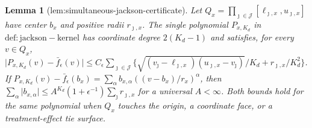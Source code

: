 \documentclass{article}
\newtheorem{lemma}{Lemma}
\begin{document}
\begin{lemma}[lem:simultaneous-jackson-certificate]\label{lem:simultaneous-jackson-certificate}
Let \(Q_x=\prod_{\jmath\in\mathcal J}[\ell_{\jmath,x},u_{\jmath,x}]\) have center \(b_x\) and positive radii \(r_{\jmath,x}\). The single polynomial \(P_{x,K_d}\) in \(\mathrm{def:jackson-kernel}\) has coordinate degree \(2(K_d-1)\) and satisfies, for every \(v\in Q_x\), \(\lvert P_{x,K_d}(v)-\bar f_\epsilon(v)\rvert\leq C_\epsilon\sum_{\jmath\in\mathcal J}\{\sqrt{(v_{\jmath}-\ell_{\jmath,x})(u_{\jmath,x}-v_{\jmath})}/K_d+r_{\jmath,x}/K_d^2\}\). If \(P_{x,K_d}(v)-\bar f_\epsilon(b_x)=\sum_\alpha b_{x,\alpha}((v-b_x)/r_x)^\alpha\), then \(\sum_\alpha\lvert b_{x,\alpha}\rvert\leq A^{K_d}(1+\epsilon^{-1})\sum_{\jmath}r_{\jmath,x}\) for a universal \(A<\infty\). Both bounds hold for the same polynomial when \(Q_x\) touches the origin, a coordinate face, or a treatment-effect tie surface.
\end{lemma}
\end{document}
